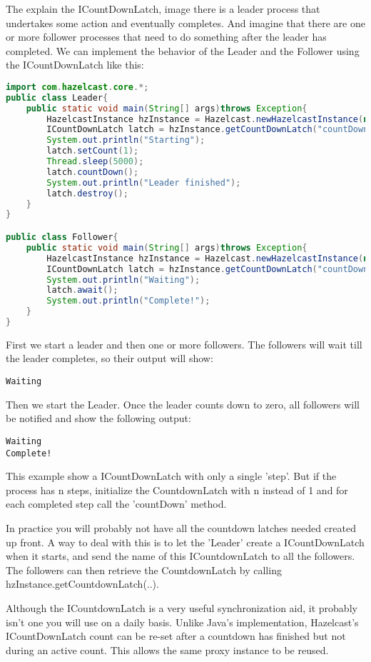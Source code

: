 The explain the ICountDownLatch, image there is a leader process that undertakes some action and eventually completes. And imagine that there are one or more follower processes that need to do something after the leader has completed. We can implement the behavior of the Leader and the Follower using the ICountDownLatch like this:
\begin{lstlisting}[language=java]
import com.hazelcast.core.*;
public class Leader{
    public static void main(String[] args)throws Exception{
        HazelcastInstance hzInstance = Hazelcast.newHazelcastInstance(null);
        ICountDownLatch latch = hzInstance.getCountDownLatch("countDownLatch");      
        System.out.println("Starting");
        latch.setCount(1); 
        Thread.sleep(5000);
        latch.countDown();
        System.out.println("Leader finished");
        latch.destroy();
    }
}

public class Follower{
    public static void main(String[] args)throws Exception{
        HazelcastInstance hzInstance = Hazelcast.newHazelcastInstance(null); 
        ICountDownLatch latch = hzInstance.getCountDownLatch("countDownLatch");
        System.out.println("Waiting");
        latch.await();
        System.out.println("Complete!");
    }
}
\end{lstlisting}
First we start a leader and then one or more followers. The followers will wait till the leader completes, so their output will show:
\begin{lstlisting}
Waiting
\end{lstlisting}
Then we start the Leader. Once the leader counts down to zero, all followers will be notified and show the following output:
\begin{lstlisting}
Waiting
Complete!
\end{lstlisting}
This example show a ICountDownLatch with only a single 'step'. But if the process has n steps, initialize the CountdownLatch with n instead of 1 and for each completed step call the 'countDown' method.

In practice you will probably not have all the countdown latches needed created up front. A way to deal with this is to let the 'Leader' create a ICountDownLatch when it starts, and send the name of this ICountdownLatch to all the followers. The followers can then retrieve the CountdownLatch by calling hzInstance.getCountdownLatch(..).

Although the ICountdownLatch is a very useful synchronization aid, it probably isn't one you will use on a daily basis. Unlike Java's implementation, Hazelcast's ICountDownLatch count can be re-set after a countdown has finished but not during an active count. This allows the same proxy instance to be reused.

